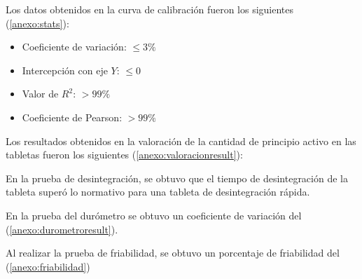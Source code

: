 Los datos obtenidos en la curva de calibración fueron los siguientes (\ref{anexo:stats}):
\begin{multicols}{2}
    \begin{itemize}
        \item Coeficiente de variación: $\leq 3\%$
        \item Intercepción con eje $Y$: $\leq 0$
        \item Valor de $R^2$: $>99\%$
        \item Coeficiente de Pearson: $>99\%$
    \end{itemize}
\end{multicols}

Los resultados obtenidos en la valoración de la cantidad de principio activo en las tabletas
fueron los siguientes (\ref{anexo:valoracionresult}):

En la prueba de desintegración, se obtuvo que el tiempo de desintegración de la tableta
superó lo normativo para una tableta de desintegración rápida.

En la prueba del durómetro se obtuvo un coeficiente de variación del %
(\ref{anexo:durometroresult}).

Al realizar la prueba de friabilidad, se obtuvo un porcentaje de friabilidad del %
(\ref{anexo:friabilidad})

